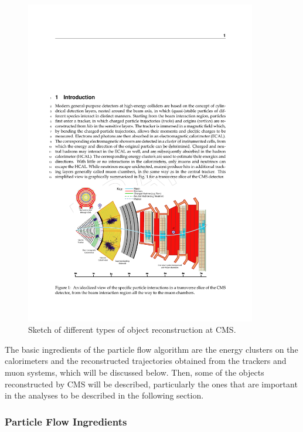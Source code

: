 \begin{figure}[h]
\centering 
\includegraphics[width=0.9\textwidth]{figures/cms_reco}\hfil
\caption{Sketch of different types of object reconstruction at CMS. }
\label{fig:cms_reco}
\end{figure}

The basic ingredients of the particle flow algorithm are the energy clusters on the calorimeters and the reconstructed trajectories obtained from the trackers and muon systems, which will be discussed below.  
Then, some of the objects reconstructed by CMS will be described, particularly the ones that are important in the analyses to be described in the following section.

\subsubsection{Particle Flow Ingredients}

